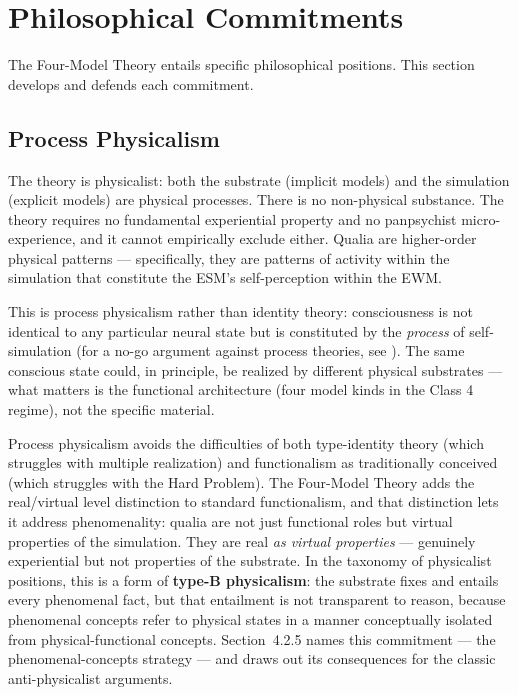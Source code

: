 \documentclass[12pt]{article}
\begin{document}
\section{Philosophical Commitments}


The Four-Model Theory entails specific philosophical positions. This section develops and defends each commitment.


\subsection{Process Physicalism}


The theory is physicalist: both the substrate (implicit models) and the simulation (explicit models) are physical processes. There is no non-physical substance. The theory requires no fundamental experiential property and no panpsychist micro-experience, and it cannot empirically exclude either. Qualia are higher-order physical patterns --- specifically, they are patterns of activity within the simulation that constitute the ESM's self-perception within the EWM.

This is process physicalism rather than identity theory: consciousness is not identical to any particular neural state but is constituted by the \emph{process} of self-simulation (for a no-go argument against process theories, see \citealp{MallavarapuPercy2026}). The same conscious state could, in principle, be realized by different physical substrates --- what matters is the functional architecture (four model kinds in the Class 4 regime), not the specific material.

Process physicalism avoids the difficulties of both type-identity theory (which struggles with multiple realization) and functionalism as traditionally conceived (which struggles with the Hard Problem). The Four-Model Theory adds the real/virtual level distinction to standard functionalism, and that distinction lets it address phenomenality: qualia are not just functional roles but virtual properties of the simulation. They are real \emph{as virtual properties} --- genuinely experiential but not properties of the substrate. In the taxonomy of physicalist positions, this is a form of \textbf{type-B physicalism}: the substrate fixes and entails every phenomenal fact, but that entailment is not transparent to reason, because phenomenal concepts refer to physical states in a manner conceptually isolated from physical-functional concepts. Section~4.2.5 names this commitment --- the phenomenal-concepts strategy --- and draws out its consequences for the classic anti-physicalist arguments.
\end{document}
